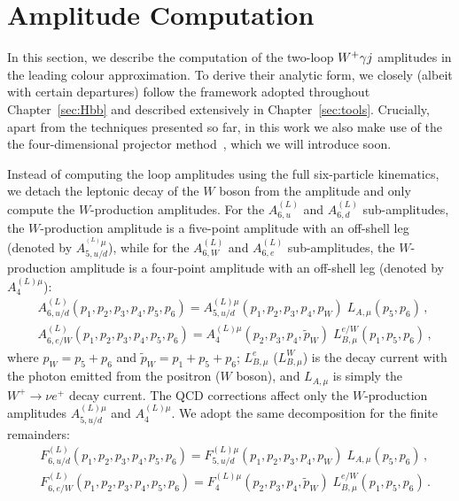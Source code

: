 \documentclass[main.tex]{subfiles}
\begin{document}
\section{Amplitude Computation}
\label{wyjsec:reduction}
In this section, we describe the computation of the two-loop $W^+\gamma j$ amplitudes in the leading colour approximation.
To derive their analytic form, we closely (albeit with certain departures) follow the framework adopted throughout Chapter~\ref{sec:Hbb} and described extensively in Chapter~\ref{sec:tools}. Crucially, apart from the techniques presented so far, in this work we also make use of the the four-dimensional projector method~\cite{Peraro:2019cjj,Peraro:2020sfm}, which we will introduce soon.

Instead of computing the loop amplitudes using the full six-particle kinematics, 
we detach the leptonic decay of the $W$ boson from the amplitude and only compute the $W$-production amplitudes.
For the $A^{(L)}_{6,u}$ and $A^{(L)}_{6,d}$ sub-amplitudes, the $W$-production amplitude is a five-point amplitude with an off-shell leg (denoted by  $A_{5,u/d}^{^{(L)}\mu}$),
while for the $A^{(L)}_{6,W}$ and $A^{(L)}_{6,e}$ sub-amplitudes, the $W$-production amplitude is a four-point amplitude with an off-shell leg (denoted by $A_{4}^{{(L)}\mu}$):
\begin{align}
& A^{(L)}_{6,u/d}(p_1,p_2,p_3,p_4,p_5,p_6) = A_{5,u/d}^{(L)\mu}(p_1,p_2,p_3,p_4,p_W) \; L_{A,\mu}(p_5,p_6) \,, \label{Wyjeq:decayA}\\
& A^{(L)}_{6,e/W}(p_1,p_2,p_3,p_4,p_5,p_6) = A_{4}^{(L)\mu}(p_2,p_3,p_4,\tilde{p}_W) \; L^{e/W}_{B,\mu}(p_1,p_5,p_6) \,, \label{Wyjeq:decayB}
\end{align}
where $p_W = p_5 + p_6$ and  $\tilde{p}_W = p_1 + p_5 + p_6$;
$L^{e}_{B,\mu}$ ($L^{W}_{B,\mu}$) is the decay current with the photon emitted from the positron ($W$ boson), and $L_{A,\mu}$ is simply the $W^+ \to \nu e^+$ decay current.
The QCD corrections affect only the $W$-production amplitudes $A_{5,u/d}^{(L)\mu}$ and $A_{4}^{(L)\mu}$. We adopt the same decomposition for the finite remainders:
\begin{align}
& F^{(L)}_{6,u/d}(p_1,p_2,p_3,p_4,p_5,p_6) = F_{5,u/d}^{(L)\mu}(p_1,p_2,p_3,p_4,p_W) \; L_{A,\mu}(p_5,p_6) \,, \label{Wyjeq:decayAF}\\
& F^{(L)}_{6,e/W}(p_1,p_2,p_3,p_4,p_5,p_6) = F_{4}^{(L)\mu}(p_2,p_3,p_4,\tilde{p}_W) \; L^{e/W}_{B,\mu}(p_1,p_5,p_6) \,. \label{Wyjeq:decayBF}
\end{align}
\end{document}
